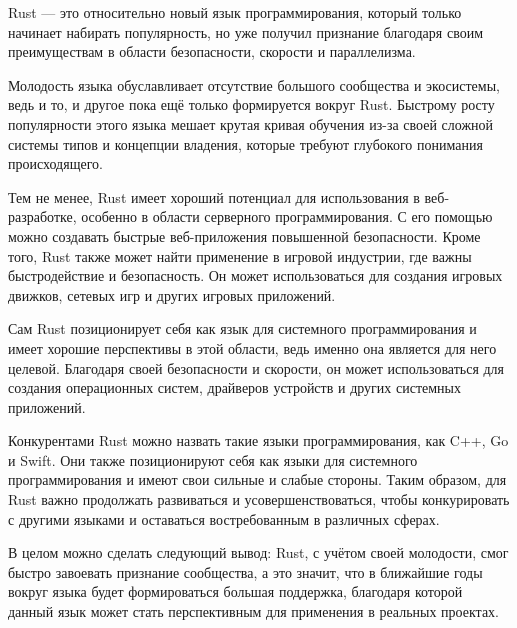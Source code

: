 Rust --- это относительно новый язык программирования, который только начинает набирать популярность, но уже получил признание благодаря своим преимуществам в области безопасности, скорости и параллелизма.

Молодость языка обуславливает отсутствие большого сообщества и экосистемы, ведь и то, и другое пока ещё только формируется вокруг Rust. Быстрому росту популярности этого языка мешает крутая кривая обучения из-за своей сложной системы типов и концепции владения, которые требуют глубокого понимания происходящего.

Тем не менее, Rust имеет хороший потенциал для использования в веб-разработке, особенно в области серверного программирования. С его помощью можно создавать быстрые веб-приложения повышенной безопасности. Кроме того, Rust также может найти применение в игровой индустрии, где важны быстродействие и безопасность. Он может использоваться для создания игровых движков, сетевых игр и других игровых приложений.

Сам Rust позиционирует себя как язык для системного программирования и имеет хорошие перспективы в этой области, ведь именно она является для него целевой. Благодаря своей безопасности и скорости, он может использоваться для создания операционных систем, драйверов устройств и других системных приложений.

Конкурентами Rust можно назвать такие языки программирования, как C++, Go и Swift. Они также позиционируют себя как языки для системного программирования и имеют свои сильные и слабые стороны. Таким образом, для Rust важно продолжать развиваться и усовершенствоваться, чтобы конкурировать с другими языками и оставаться востребованным в различных сферах.

В целом можно сделать следующий вывод: Rust, с учётом своей молодости, смог быстро завоевать признание сообщества, а это значит, что в ближайшие годы вокруг языка будет формироваться большая поддержка, благодаря которой данный язык может стать перспективным для применения в реальных проектах.